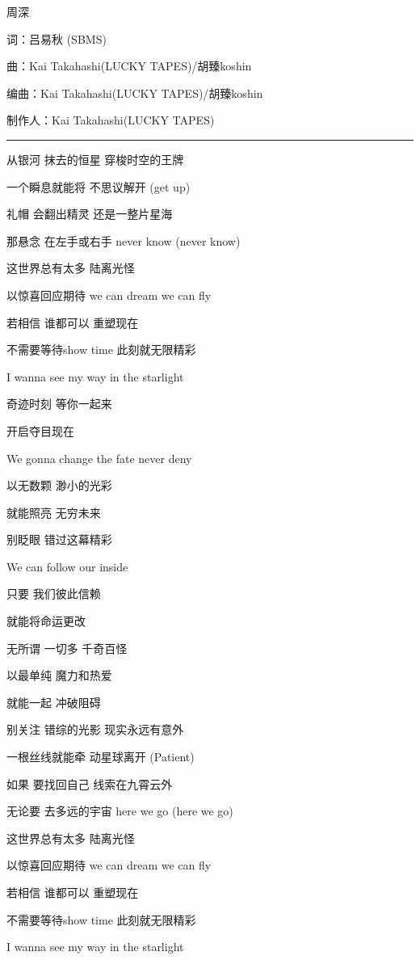 \documentclass[]{ctexbook}
\begin{document}
周深

词：吕易秋 (SBMS)

曲：Kai Takahashi(LUCKY TAPES)/胡臻koshin

编曲：Kai Takahashi(LUCKY TAPES)/胡臻koshin

制作人：Kai Takahashi(LUCKY TAPES)

\begin{center}\rule{0.5\linewidth}{0.5pt}\end{center}

从银河 抹去的恒星 穿梭时空的王牌

一个瞬息就能将 不思议解开 (get up)

礼帽 会翻出精灵 还是一整片星海

那悬念 在左手或右手 never know (never know)

这世界总有太多 陆离光怪

以惊喜回应期待 we can dream we can fly

若相信 谁都可以 重塑现在

不需要等待show time 此刻就无限精彩

I wanna see my way in the starlight

奇迹时刻 等你一起来

开启夺目现在

We gonna change the fate never deny

以无数颗 渺小的光彩

就能照亮 无穷未来

别眨眼 错过这幕精彩

We can follow our inside

只要 我们彼此信赖

就能将命运更改

无所谓 一切多 千奇百怪

以最单纯 魔力和热爱

就能一起 冲破阻碍

别关注 错综的光影 现实永远有意外

一根丝线就能牵 动星球离开 (Patient)

如果 要找回自己 线索在九霄云外

无论要 去多远的宇宙 here we go (here we go)

这世界总有太多 陆离光怪

以惊喜回应期待 we can dream we can fly

若相信 谁都可以 重塑现在

不需要等待show time 此刻就无限精彩

I wanna see my way in the starlight
\end{document}
